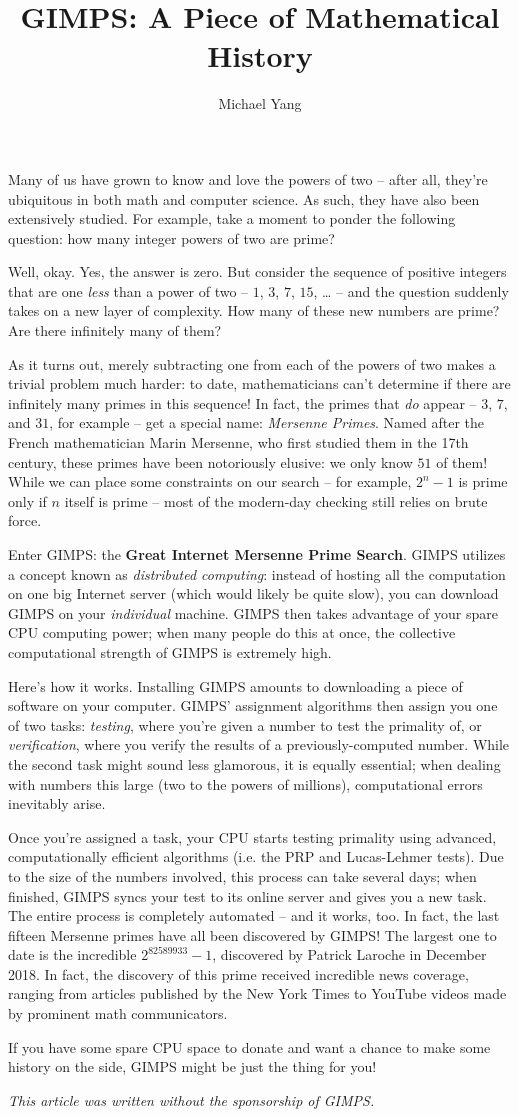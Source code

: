 \documentclass{article}
\title{GIMPS: A Piece of Mathematical History}
\author{Michael Yang}
\begin{document}
\maketitle
Many of us have grown to know and love the powers of two – after all, they’re ubiquitous in both math and computer science. As such, they have also been extensively studied. For example, take a moment to ponder the following question: how many integer powers of two are prime?

Well, okay. Yes, the answer is zero. But consider the sequence of positive integers that are one \textit{less} than a power of two – $1$, $3$, $7$, $15$, … – and the question suddenly takes on a new layer of complexity. How many of these new numbers are prime? Are there infinitely many of them?

As it turns out, merely subtracting one from each of the powers of two makes a trivial problem much harder: to date, mathematicians can’t determine if there are infinitely many primes in this sequence! In fact, the primes that \textit{do} appear – $3$, $7$, and $31$, for example – get a special name: \textit{Mersenne Primes}. Named after the French mathematician Marin Mersenne, who first studied them in the 17th century, these primes have been notoriously elusive: we only know $51$ of them! While we can place some constraints on our search – for example, $2^n-1$ is prime only if $n$ itself is prime – most of the modern-day checking still relies on brute force.

Enter GIMPS: the \textbf{Great Internet Mersenne Prime Search}. GIMPS utilizes a concept known as \textit{distributed computing}: instead of hosting all the computation on one big Internet server (which would likely be quite slow), you can download GIMPS on your \textit{individual} machine. GIMPS then takes advantage of your spare CPU computing power; when many people do this at once, the collective computational strength of GIMPS is extremely high.

Here’s how it works. Installing GIMPS amounts to downloading a piece of software on your computer. GIMPS’ assignment algorithms then assign you one of two tasks: \textit{testing}, where you’re given a number to test the primality of, or \textit{verification}, where you verify the results of a previously-computed number.  While the second task might sound less glamorous, it is equally essential; when dealing with numbers this large (two to the powers of millions), computational errors inevitably arise. 

Once you’re assigned a task, your CPU starts testing primality using advanced, computationally efficient algorithms (i.e. the PRP and Lucas-Lehmer tests). Due to the size of the numbers involved, this process can take several days; when finished, GIMPS syncs your test to its online server and gives you a new task. The entire process is completely automated – and it works, too. In fact, the last fifteen Mersenne primes have all been discovered by GIMPS! The largest one to date is the incredible $2^{82589933}-1$, discovered by Patrick Laroche in December 2018. In fact, the discovery of this prime received incredible news coverage, ranging from articles published by the New York Times to YouTube videos made by prominent math communicators.

If you have some spare CPU space to donate and want a chance to make some history on the side, GIMPS might be just the thing for you!
 
\textit{This article was written without the sponsorship of GIMPS.}
\end{document}
